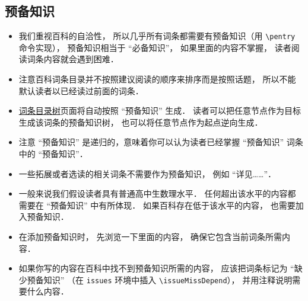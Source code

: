 
\subsection{预备知识}
\begin{itemize}
\item 我们重视百科的自洽性， 所以几乎所有词条都需要有预备知识（用 \verb|\pentry| 命令实现）， 预备知识相当于 “必备知识”， 如果里面的内容不掌握， 读者阅读词条内容就会遇到困难．
\item 注意百科词条目录并不按照建议阅读的顺序来排序而是按照话题， 所以不能默认读者以已经读过前面的词条．
\item \href{http://wuli.wiki/tree/}{词条目录树}页面将自动按照 “预备知识” 生成． 读者可以把任意节点作为目标生成该词条的预备知识树， 也可以将任意节点作为起点逆向生成．
\item 注意 “预备知识” 是递归的，意味着你可以认为读者已经掌握 “预备知识” 词条中的 “预备知识”．
\item 一些拓展或者选读的相关词条不需要作为预备知识， 例如 “详见……”．
\item 一般来说我们假设读者具有普通高中生数理水平． 任何超出该水平的内容都需要在 “预备知识” 中有所体现． 如果百科存在低于该水平的内容， 也需要加入预备知识．
\item 在添加预备知识时， 先浏览一下里面的内容， 确保它包含当前词条所需内容．
\item 如果你写的内容在百科中找不到预备知识所需的内容， 应该把词条标记为 “缺少预备知识” （在 \verb|issues| 环境中插入 \verb|\issueMissDepend|）， 并用注释说明需要什么内容．
\end{itemize}
